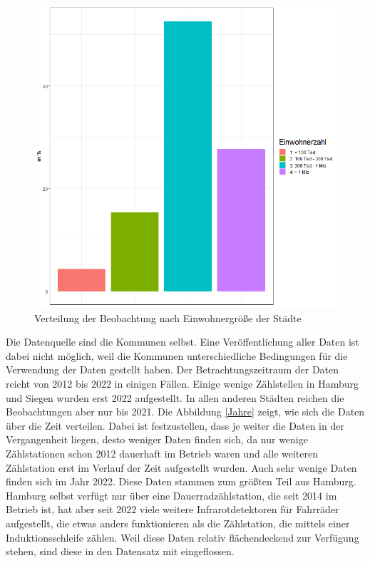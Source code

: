 \documentclass[a4paper,12pt]{thesis}
\begin{document}
\begin{figure}[!ht]
	\centering
	\includegraphics[width=\textwidth]{Plots/plot10.png}
	\caption{Verteilung der Beobachtung nach Einwohnergröße der Städte}
	\label{Einwohnergroese}
\end{figure}

Die Datenquelle sind die Kommunen selbst. Eine Veröffentlichung aller Daten ist dabei nicht möglich, weil die Kommunen unterschiedliche Bedingungen für die Verwendung der Daten gestellt haben. Der Betrachtungszeitraum der Daten reicht von 2012 bis 2022 in einigen Fällen. Einige wenige Zählstellen in Hamburg und Siegen wurden erst 2022 aufgestellt. In allen anderen Städten reichen die Beobachtungen aber nur bis 2021. Die Abbildung \ref{Jahre} zeigt, wie sich die Daten über die Zeit verteilen. Dabei ist festzustellen, dass je weiter die Daten in der Vergangenheit liegen, desto weniger Daten finden sich, da nur wenige Zählstationen schon 2012 dauerhaft im Betrieb waren und alle weiteren Zählstation erst im Verlauf der Zeit aufgestellt wurden. Auch sehr wenige Daten finden sich im Jahr 2022. Diese Daten stammen zum größten Teil aus Hamburg. Hamburg selbst verfügt nur über eine Dauerradzählstation, die seit 2014 im Betrieb ist, hat aber seit 2022 viele weitere Infrarotdetektoren für Fahrräder aufgestellt, die etwas anders funktionieren als die Zählstation, die mittels einer Induktionsschleife zählen. Weil diese Daten relativ flächendeckend zur Verfügung stehen, sind diese in den Datensatz mit eingeflossen.
\end{document}
